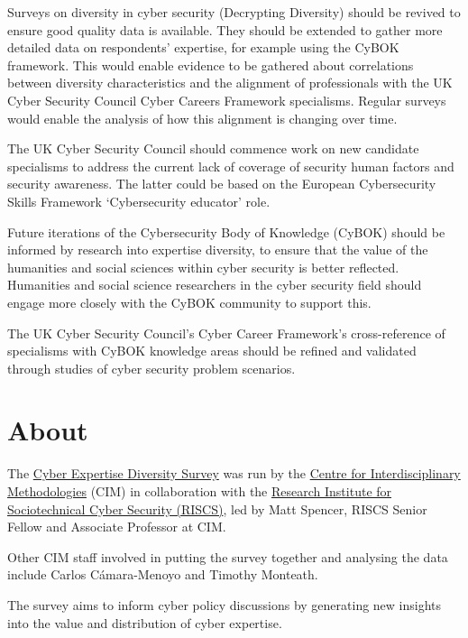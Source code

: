 \documentclass[
  a4paper,
]{book}
\begin{document}
Surveys on diversity in cyber security (Decrypting Diversity) should be
revived to ensure good quality data is available. They should be
extended to gather more detailed data on respondents' expertise, for
example using the CyBOK framework. This would enable evidence to be
gathered about correlations between diversity characteristics and the
alignment of professionals with the UK Cyber Security Council Cyber
Careers Framework specialisms. Regular surveys would enable the analysis
of how this alignment is changing over time.

The UK Cyber Security Council should commence work on new candidate
specialisms to address the current lack of coverage of security human
factors and security awareness. The latter could be based on the
European Cybersecurity Skills Framework `Cybersecurity educator' role.

Future iterations of the Cybersecurity Body of Knowledge (CyBOK) should
be informed by research into expertise diversity, to ensure that the
value of the humanities and social sciences within cyber security is
better reflected. Humanities and social science researchers in the cyber
security field should engage more closely with the CyBOK community to
support this.

The UK Cyber Security Council's Cyber Career Framework's cross-reference
of specialisms with CyBOK knowledge areas should be refined and
validated through studies of cyber security problem scenarios.


\chapter*{About}\label{about}


The
\href{https://warwick.ac.uk/fac/cross_fac/cim/research/cyber_expertise_diversity}{Cyber
Expertise Diversity Survey} was run by the
\href{https://warwick.ac.uk/cim}{Centre for Interdisciplinary
Methodologies} (CIM) in collaboration with the
\href{https://riscs.org.uk}{Research Institute for Sociotechnical Cyber
Security (RISCS)}, led by Matt Spencer, RISCS Senior Fellow and
Associate Professor at CIM.

Other CIM staff involved in putting the survey together and analysing
the data include Carlos Cámara-Menoyo and Timothy Monteath.

The survey aims to inform cyber policy discussions by generating new
insights into the value and distribution of cyber expertise.
\end{document}
